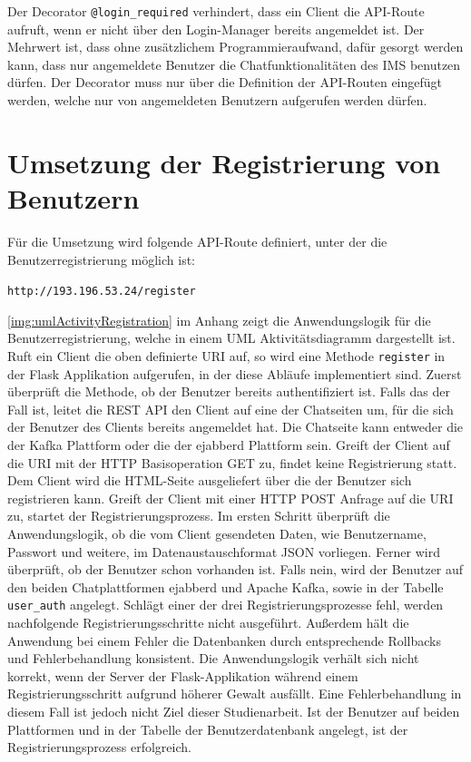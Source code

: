 \documentclass[a4paper,titlepage,halfparskip,12pt]{scrreprt}
\begin{document}
\begin{onehalfspacing}
Der Decorator \texttt{@login\_required} verhindert, dass ein Client die \acs{API}-Route aufruft, wenn er nicht über den Login-Manager bereits angemeldet ist. Der Mehrwert ist, dass ohne zusätzlichem Programmieraufwand, dafür gesorgt werden kann, dass nur angemeldete Benutzer die Chatfunktionalitäten des \acs{IMS} benutzen dürfen. Der Decorator muss nur über die Definition der \acs{API}-Routen eingefügt werden, welche nur von angemeldeten Benutzern aufgerufen werden dürfen.\cite{flaskLogin}

\pagebreak

\section{Umsetzung der Registrierung von Benutzern}

Für die Umsetzung wird folgende \acs{API}-Route definiert, unter der die Benutzerregistrierung möglich ist:

\texttt{http://193.196.53.24/register}

\autoref{img:umlActivityRegistration} im Anhang zeigt die Anwendungslogik für die Benutzerregistrierung, welche in einem \acs{UML} Aktivitätsdiagramm dargestellt ist. Ruft ein Client die oben definierte \acs{URI} auf, so wird eine Methode \texttt{register} in der Flask Applikation aufgerufen, in der diese Abläufe implementiert sind. Zuerst überprüft die Methode, ob der Benutzer bereits authentifiziert ist. Falls das der Fall ist, leitet die \acs{REST} \acs{API} den Client auf eine der Chatseiten um, für die sich der Benutzer des Clients bereits angemeldet hat. Die Chatseite kann entweder die der Kafka Plattform oder die der ejabberd Plattform sein. Greift der Client auf die \acs{URI} mit der \acs{HTTP} Basisoperation GET zu, findet keine Registrierung statt. Dem Client wird die \acs{HTML}-Seite ausgeliefert über die der Benutzer sich registrieren kann. Greift der Client mit einer \acs{HTTP} POST Anfrage auf die \acs{URI} zu, startet der Registrierungsprozess. Im ersten Schritt überprüft die Anwendungslogik, ob die vom Client gesendeten Daten, wie Benutzername, Passwort und weitere, im Datenaustauschformat \acs{JSON} vorliegen. Ferner wird überprüft, ob der Benutzer schon vorhanden ist. Falls nein, wird der Benutzer auf den beiden Chatplattformen ejabberd und Apache Kafka, sowie in der Tabelle \texttt{user\_auth} angelegt. Schlägt einer der drei Registrierungsprozesse fehl, werden nachfolgende Registrierungsschritte nicht ausgeführt. Außerdem hält die Anwendung bei einem Fehler die Datenbanken durch entsprechende Rollbacks und Fehlerbehandlung konsistent. Die Anwendungslogik verhält sich nicht korrekt, wenn der Server der Flask-Applikation während einem Registrierungsschritt aufgrund höherer Gewalt ausfällt. Eine Fehlerbehandlung in diesem Fall ist jedoch nicht Ziel dieser Studienarbeit. Ist der Benutzer auf beiden Plattformen und in der Tabelle der Benutzerdatenbank angelegt, ist der Registrierungsprozess erfolgreich.


\end{onehalfspacing}
\end{document}
